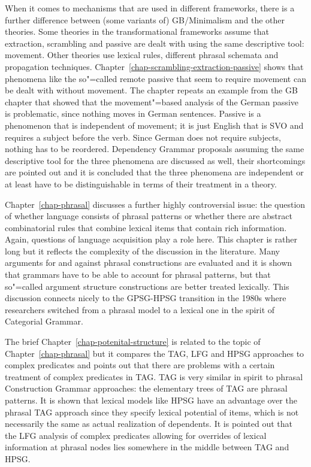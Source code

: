 When it comes to mechanisms that are used in different frameworks, there is a further difference
between (some variants of) GB/Minimalism and the other theories. Some theories in the
transformational frameworks assume that extraction, scrambling and passive are dealt with using the
same descriptive tool: movement. Other theories use lexical rules, different phrasal schemata and
\slasch propagation techniques. Chapter~\ref{chap-scrambling-extraction-passive} shows that
phenomena like the so"=called remote passive that seem to require movement can be dealt with without
movement. The chapter repeats an example from the GB chapter that showed that the movement"=based
analysis of the German passive is problematic, since nothing moves in German sentences. Passive is a
phenomenon that is independent of movement; it is just English that is SVO and requires a subject
before the verb. Since German does not require subjects, nothing has to be reordered. Dependency
Grammar proposals assuming the same descriptive tool for the three phenomena are discussed as well,
their shortcomings are pointed out and it is concluded that the three phenomena are independent
or at least have to be distinguishable in terms of their treatment in a theory.

Chapter~\ref{chap-phrasal} discusses a further highly controversial issue: the question of whether
language consists of phrasal patterns or whether there are abstract combinatorial rules that combine
lexical items that contain rich information. Again, questions of language acquisition play a role
here. This chapter is rather long but it reflects the complexity of the discussion in the
literature. Many arguments for and against phrasal constructions are evaluated and it is shown that
grammars have to be able to account for phrasal patterns, but that so"=called argument structure
constructions are better treated lexically. This discussion connects nicely to the GPSG-HPSG
transition in the 1980s where researchers switched from a phrasal model to a lexical one in the
spirit of Categorial Grammar.

The brief Chapter~\ref{chap-potenital-structure} is related to the topic of
Chapter~\ref{chap-phrasal} but it compares the TAG, LFG and HPSG approaches to complex predicates
and points out that there are problems with a certain treatment of complex predicates in TAG. TAG is
very similar in spirit to phrasal Construction Grammar approaches: the elementary trees of TAG are
phrasal patterns. It is shown that lexical models like HPSG have an advantage over the phrasal TAG approach
since they specify lexical potential of items, which is not necessarily the same as actual
realization of dependents. It is pointed out that the LFG analysis of complex predicates allowing
for overrides of lexical information at phrasal nodes lies somewhere in the middle between TAG and HPSG.

